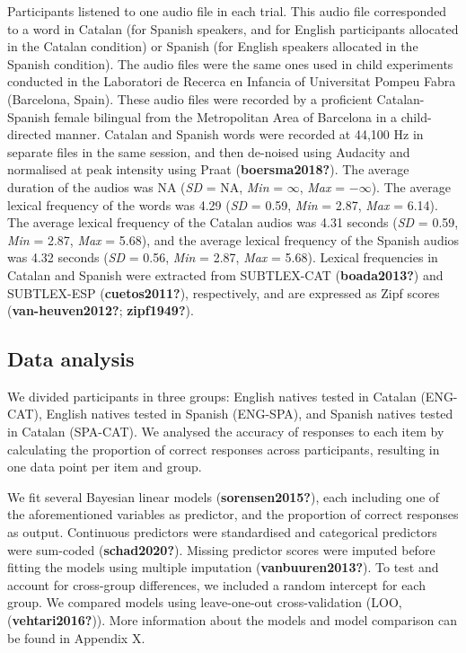 \documentclass[
  english,
  man]{apa6}
\begin{document}
Participants listened to one audio file in each trial. This audio file corresponded to a word in Catalan (for Spanish speakers, and for English participants allocated in the Catalan condition) or Spanish (for English speakers allocated in the Spanish condition). The audio files were the same ones used in child experiments conducted in the Laboratori de Recerca en Infancia of Universitat Pompeu Fabra (Barcelona, Spain). These audio files were recorded by a proficient Catalan-Spanish female bilingual from the Metropolitan Area of Barcelona in a child-directed manner. Catalan and Spanish words were recorded at 44,100 Hz in separate files in the same session, and then de-noised using Audacity and normalised at peak intensity using Praat (\textbf{boersma2018?}). The average duration of the audios was NA (\emph{SD} = NA, \emph{Min} = \(\infty\), \emph{Max} = \(-\infty\)). The average lexical frequency of the words was 4.29 (\emph{SD} = 0.59, \emph{Min} = 2.87, \emph{Max} = 6.14). The average lexical frequency of the Catalan audios was 4.31 seconds (\emph{SD} = 0.59, \emph{Min} = 2.87, \emph{Max} = 5.68), and the average lexical frequency of the Spanish audios was 4.32 seconds (\emph{SD} = 0.56, \emph{Min} = 2.87, \emph{Max} = 5.68). Lexical frequencies in Catalan and Spanish were extracted from SUBTLEX-CAT (\textbf{boada2013?}) and SUBTLEX-ESP (\textbf{cuetos2011?}), respectively, and are expressed as Zipf scores (\textbf{van-heuven2012?}; \textbf{zipf1949?}).

\hypertarget{data-analysis}{%
\subsection{Data analysis}\label{data-analysis}}

We divided participants in three groups: English natives tested in Catalan (ENG-CAT), English natives tested in Spanish (ENG-SPA), and Spanish natives tested in Catalan (SPA-CAT). We analysed the accuracy of responses to each item by calculating the proportion of correct responses across participants, resulting in one data point per item and group.

We fit several Bayesian linear models (\textbf{sorensen2015?}), each including one of the aforementioned variables as predictor, and the proportion of correct responses as output. Continuous predictors were standardised and categorical predictors were sum-coded (\textbf{schad2020?}). Missing predictor scores were imputed before fitting the models using multiple imputation (\textbf{vanbuuren2013?}). To test and account for cross-group differences, we included a random intercept for each group. We compared models using leave-one-out cross-validation (LOO, (\textbf{vehtari2016?})). More information about the models and model comparison can be found in Appendix X.
\end{document}
